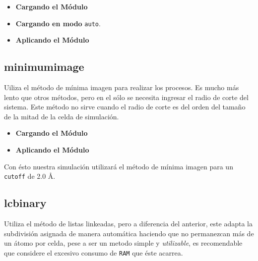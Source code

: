 \begin{itemize}
 \item \textbf{Cargando el M\'odulo}
 \item \textbf{Cargando en modo} \texttt{auto}.
 \item \textbf{Aplicando el M\'odulo}
\end{itemize}

\subsection{minimumimage}
Uiliza el m\'etodo de m\'inima imagen para realizar los procesos. Es mucho m\'as lento que otros m\'etodos, pero en el s\'olo se necesita ingresar el radio de corte del sistema. Este m\'etodo no sirve cuando el radio de corte es del orden del tama\~no de la mitad de la celda de simulaci\'on.

\begin{itemize}
 \item \textbf{Cargando el M\'odulo}
 \item \textbf{Aplicando el M\'odulo}
\end{itemize}

Con \'esto nuestra simulaci\'on utilizar\'a el m\'etodo de m\'inima imagen para un \verb|cutoff| de 2.0 \AA.

\subsection{lcbinary}
Utiliza el m\'etodo de listas linkeadas, pero a diferencia del anterior, este adapta la subdivisi\'on asignada de manera autom\'atica haciendo que no permanezcan m\'as de un \'atomo por celda, pese a ser un metodo simple y \textit{utilizable}, es recomendable que considere el excesivo consumo de \verb|RAM| que \'este acarrea.

